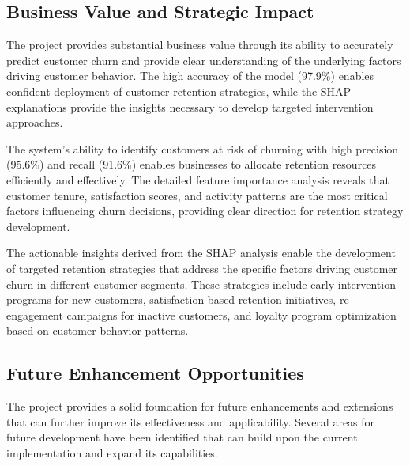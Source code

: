 \documentclass{article}
\begin{document}
\subsection{Business Value and Strategic Impact}

The project provides substantial business value through its ability to accurately predict customer churn and provide clear understanding of the underlying factors driving customer behavior. The high accuracy of the model (97.9\%) enables confident deployment of customer retention strategies, while the SHAP explanations provide the insights necessary to develop targeted intervention approaches.

The system's ability to identify customers at risk of churning with high precision (95.6\%) and recall (91.6\%) enables businesses to allocate retention resources efficiently and effectively. The detailed feature importance analysis reveals that customer tenure, satisfaction scores, and activity patterns are the most critical factors influencing churn decisions, providing clear direction for retention strategy development.

The actionable insights derived from the SHAP analysis enable the development of targeted retention strategies that address the specific factors driving customer churn in different customer segments. These strategies include early intervention programs for new customers, satisfaction-based retention initiatives, re-engagement campaigns for inactive customers, and loyalty program optimization based on customer behavior patterns.

\subsection{Future Enhancement Opportunities}

The project provides a solid foundation for future enhancements and extensions that can further improve its effectiveness and applicability. Several areas for future development have been identified that can build upon the current implementation and expand its capabilities.
\end{document}
